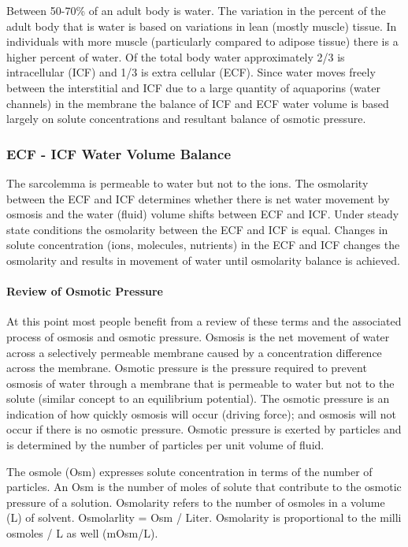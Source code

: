 Between 50-70\% of an adult body is water. The variation in the percent of the adult body that is water is based on variations in lean (mostly muscle) tissue. In individuals with more muscle (particularly compared to adipose tissue) there is a higher percent of water. Of the total body water approximately 2/3 is intracellular (ICF) and 1/3 is extra cellular (ECF). Since water moves freely between the interstitial and ICF due to a large quantity of aquaporins (water channels) in the membrane the balance of ICF and ECF water volume is based largely on solute concentrations and resultant balance of osmotic pressure.

\subsubsection{ECF - ICF Water Volume Balance}

The sarcolemma is permeable to water but not to the ions. The osmolarity between the ECF and ICF determines whether there is net water movement by osmosis and the water (fluid) volume shifts between ECF and ICF. Under steady state conditions the osmolarity between the ECF and ICF is equal. Changes in solute concentration (ions, molecules, nutrients) in the ECF and ICF changes the osmolarity and results in movement of water until osmolarity balance is achieved.

\paragraph{Review of Osmotic Pressure}

At this point most people benefit from a review of these terms and the associated process of osmosis and osmotic pressure. Osmosis is the net movement of water across a selectively permeable membrane caused by a concentration difference across the membrane. Osmotic pressure is the pressure required to prevent osmosis of water through a membrane that is permeable to water but not to the solute (similar concept to an equilibrium potential). The osmotic pressure is an indication of how quickly osmosis will occur (driving force); and osmosis will not occur if there is no osmotic pressure. Osmotic pressure is exerted by particles and is determined by the number of particles per unit volume of fluid. 

The osmole (Osm) expresses solute concentration in terms of the number of particles. An Osm is the number of moles of solute that contribute to the osmotic pressure of a solution. Osmolarity refers to the number of osmoles in a volume (L) of solvent. Osmolarlity = Osm / Liter. Osmolarity is proportional to the milli osmoles / L as well (mOsm/L).

